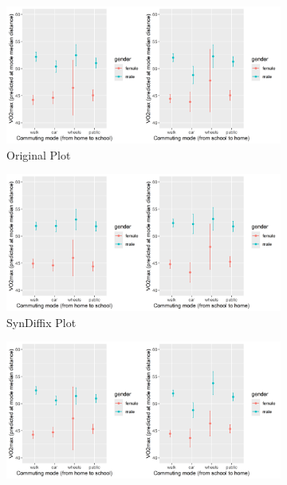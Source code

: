 

    \begin{figure}[htbp]
        \centering
        \begin{subfigure}[b]{0.48\textwidth}
            \centering
            \includegraphics[width=\textwidth]{figs/r_orig_plot.png}
            \caption{Original Plot}
            \label{fig:r_orig_plot}
        \end{subfigure}
        \hspace{0.0\textwidth}
        \begin{subfigure}[b]{0.48\textwidth}
            \centering
            \includegraphics[width=\textwidth]{figs/r_sdx_plot.png}
            \caption{SynDiffix Plot}
            \label{fig:r_sdx_plot}
        \end{subfigure}
        \vfill
        \begin{subfigure}[b]{0.48\textwidth}
            \centering
            \includegraphics[width=\textwidth]{figs/r_arx_plot.png}

\end{subfigure}
\end{figure}
